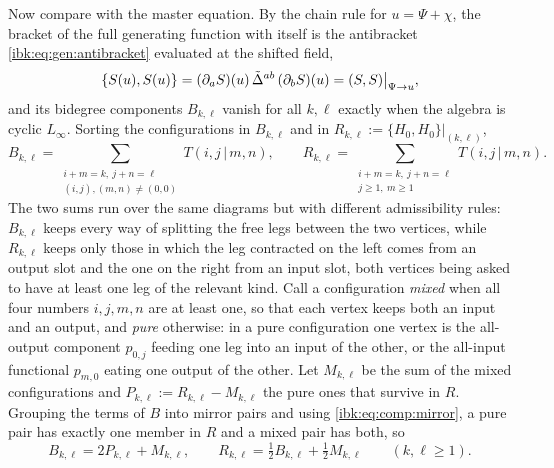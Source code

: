 Now compare with the master equation. By the chain rule for $u=\Psi+\chi$, the bracket of the full generating function with itself is the antibracket \eqref{ibk:eq:gen:antibracket} evaluated at the shifted field,
\begin{equation}
  \label{ibk:eq:comp:master}
  \{S(u),S(u)\}
    = (\partial_aS)(u)\,\tilde\Delta^{ab}\,(\partial_bS)(u)
    = (S,S)\big|_{\Psi\to u},
\end{equation}
and its bidegree components $B_{k,\ell}$ vanish for all $k,\ell$ exactly when the algebra is cyclic $L_\infty$. Sorting the configurations in $B_{k,\ell}$ and in $R_{k,\ell}:=\{H_0,H_0\}|_{(k,\ell)}$,
\begin{equation}
  \label{ibk:eq:comp:sums}
  B_{k,\ell}
    = \sum_{\substack{i+m=k,\ j+n=\ell\\ (i,j),(m,n)\neq(0,0)}}T(i,j\,|\,m,n),
  \qquad
  R_{k,\ell}
    = \sum_{\substack{i+m=k,\ j+n=\ell\\ j\ge1,\ m\ge1}}T(i,j\,|\,m,n).
\end{equation}
The two sums run over the same diagrams but with different admissibility rules: $B_{k,\ell}$ keeps every way of splitting the free legs between the two vertices, while $R_{k,\ell}$ keeps only those in which the leg contracted on the left comes from an output slot and the one on the right from an input slot, both vertices being asked to have at least one leg of the relevant kind. Call a configuration \emph{mixed} when all four numbers $i,j,m,n$ are at least one, so that each vertex keeps both an input and an output, and \emph{pure} otherwise: in a pure configuration one vertex is the all-output component $p_{0,j}$ feeding one leg into an input of the other, or the all-input functional $p_{m,0}$ eating one output of the other. Let $M_{k,\ell}$ be the sum of the mixed configurations and $P_{k,\ell}:=R_{k,\ell}-M_{k,\ell}$ the pure ones that survive in $R$. Grouping the terms of $B$ into mirror pairs and using \eqref{ibk:eq:comp:mirror}, a pure pair has exactly one member in $R$ and a mixed pair has both, so
\begin{equation}
  \label{ibk:eq:comp:decomposition}
  B_{k,\ell}
    = 2P_{k,\ell}+M_{k,\ell},
  \qquad
  R_{k,\ell}
    = \tfrac12 B_{k,\ell}+\tfrac12 M_{k,\ell}
  \qquad (k,\ell\ge1).
\end{equation}

